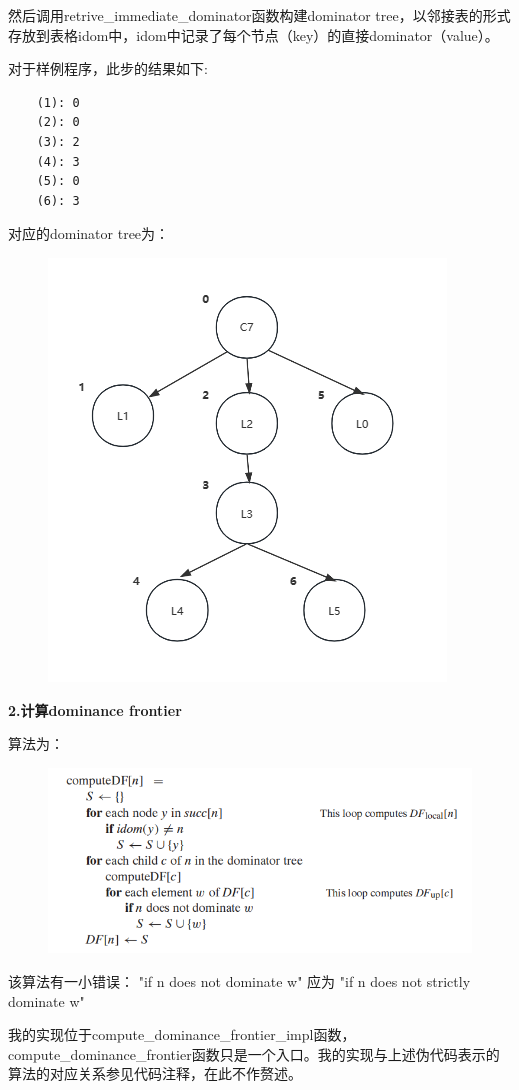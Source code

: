 \documentclass{article}
\begin{document}
然后调用retrive\_immediate\_dominator函数构建dominator tree，以邻接表的形式存放到表格idom中，idom中记录了每个节点（key）的直接dominator（value）。

对于样例程序，此步的结果如下:

\begin{lstlisting}
    (1): 0
    (2): 0
    (3): 2
    (4): 3
    (5): 0
    (6): 3
\end{lstlisting}

对应的dominator tree为：

\begin{figure}[h]
  \centering
  \includegraphics[width=.74\linewidth]{pics/idom.jpg}
  \label{fig:idom}
\end{figure}

\textbf{2.计算dominance frontier}

算法为：
\begin{figure}[h]
  \centering
  \includegraphics[width=.6\linewidth]{pics/df.jpg}
  \label{fig:df_theory}
\end{figure}

该算法有一小错误： "if n does not dominate w" 应为 "if n does not strictly dominate w"

我的实现位于compute\_dominance\_frontier\_impl函数，compute\_dominance\_frontier函数只是一个入口。我的实现与上述伪代码表示的算法的对应关系参见代码注释，在此不作赘述。
\end{document}
